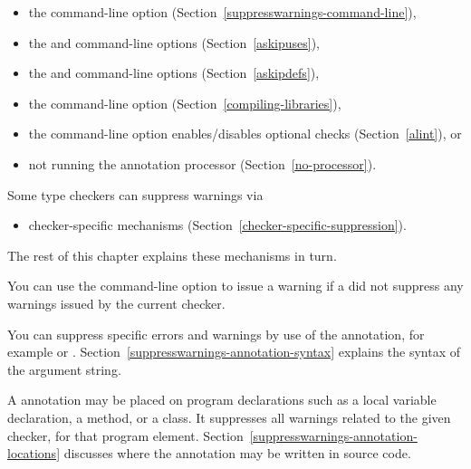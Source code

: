 \begin{itemize}
\item
  the  command-line option (Section~\ref{suppresswarnings-command-line}),
\item
  the  and  command-line options (Section~\ref{askipuses}),
\item
  the  and  command-line options (Section~\ref{askipdefs}),
\item
  the  command-line
  option (Section~\ref{compiling-libraries}),
\item
  the  command-line option enables/disables optional checks (Section~\ref{alint}), or
\item
  not running the annotation processor
  (Section~\ref{no-processor}).
\end{itemize}

Some type checkers can suppress warnings via
\begin{itemize}
\item
  checker-specific mechanisms (Section~\ref{checker-specific-suppression}).
\end{itemize}

\noindent
The rest of this chapter explains these mechanisms in turn.

You can use the  command-line option to issue a
warning if a  did not suppress any warnings issued by the current checker.



\begin{sloppypar}
You can suppress specific errors and warnings by use of the
 annotation, for example
 or .
Section~\ref{suppresswarnings-annotation-syntax} explains the syntax of the
argument string.
\end{sloppypar}

A 
annotation may be placed on program declarations such as a local
variable declaration, a method, or a class.  It suppresses all warnings
related to the given checker, for that program element.
Section~\ref{suppresswarnings-annotation-locations} discusses where the
annotation may be written in source code.

